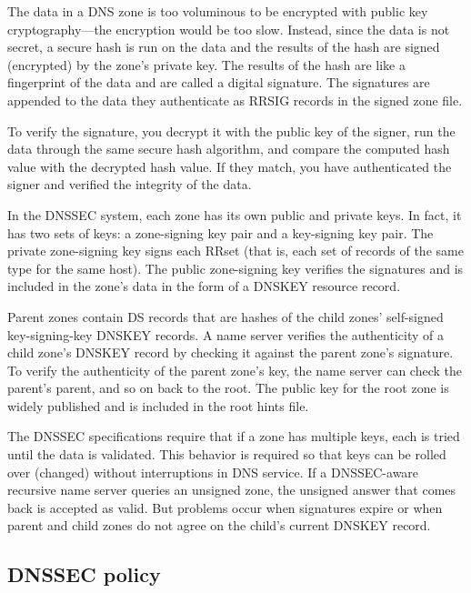 The data in a DNS zone is too voluminous to be encrypted with public key
cryptography---the encryption would be too slow. Instead, since the data
is not secret, a secure hash is run on the data and the results of the
hash are signed (encrypted) by the zone's private key. The results of
the hash are like a fingerprint of the data and are called a digital
signature. The signatures are appended to the data they authenticate as
RRSIG records in the signed zone file.

To verify the signature, you decrypt it with the public key of the
signer, run the data through the same secure hash algorithm, and compare
the computed hash value with the decrypted hash value. If they match,
you have authenticated the signer and verified the integrity of the
data.

In the DNSSEC system, each zone has its own public and private keys. In
fact, it has two sets of keys: a zone-signing key pair and a key-signing
key pair. The private zone-signing key signs each RRset (that is, each
set of records of the same type for the same host). The public
zone-signing key verifies the signatures and is included in the zone's
data in the form of a DNSKEY resource record.

Parent zones contain DS records that are hashes of the child zones'
self-signed key-signing-key DNSKEY records. A name server verifies the
authenticity of a child zone's DNSKEY record by checking it against the
parent zone's signature. To verify the authenticity of the parent zone's
key, the name server can check the parent's parent, and so on back to
the root. The public key for the root zone is widely published and is
included in the root hints file.

The DNSSEC specifications require that if a zone has multiple keys, each
is tried until the data is validated. This behavior is required so that
keys can be rolled over (changed) without interruptions in DNS service.
If a DNSSEC-aware recursive name server queries an unsigned zone, the
unsigned answer that comes back is accepted as valid. But problems occur
when signatures expire or when parent and child zones do not agree on
the child's current DNSKEY record.

\protect\hypertarget{part0024_split_060.html}{}{}

\hypertarget{part0024_split_060.htmlux5cux23_idContainer1069}{}
\hypertarget{part0024_split_060.htmlux5cux23calibre_pb_59}{%
\subsection[DNSSEC
policy]{\texorpdfstring{\protect\hypertarget{part0024_split_060.htmlux5cux23_idTextAnchor939}{}{}DNSSEC
policy}{DNSSEC policy}}\label{part0024_split_060.htmlux5cux23calibre_pb_59}}

